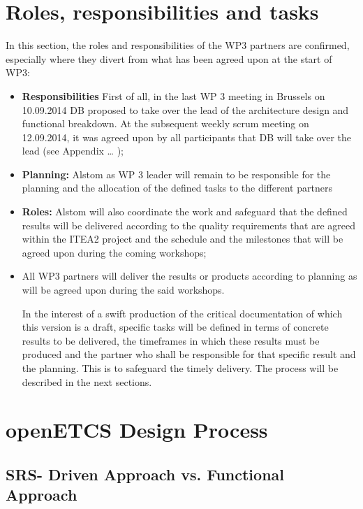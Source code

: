 \section{Roles, responsibilities and tasks}
In this section, the roles and responsibilities of the WP3 partners are confirmed, especially where they divert from what has been agreed upon at the start of WP3:
\begin{itemize}
\item\textbf{Responsibilities} First of all, in the last WP 3 meeting in Brussels on  10.09.2014 DB proposed to take over the lead of the architecture design and functional breakdown. At the subsequent weekly scrum meeting on 12.09.2014,  it was agreed upon by all participants that DB will take over the lead (see Appendix … );
\item\textbf{Planning:} Alstom as WP 3 leader will remain to be responsible for the planning and the allocation of the defined tasks to the different partners\\
\item\textbf{Roles:} Alstom will also coordinate the work and safeguard that the defined results will be delivered according to the quality requirements that are agreed within the ITEA2 project and the schedule and the milestones that will be agreed upon during the coming workshops;
\item All WP3 partners will deliver the results or products according to planning as will be agreed upon during the said workshops.

In the interest of a swift production of the critical documentation of which this version is a draft, specific tasks will be defined in terms of concrete results to be delivered, the timeframes in which these results must be produced and the partner who shall be responsible for that specific result and the planning. This is to safeguard the timely delivery. The process will be described in the next sections.
\end{itemize}






\section{openETCS Design Process}


\subsection{SRS- Driven Approach vs. Functional Approach}

